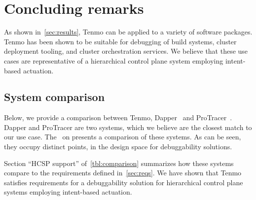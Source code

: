 \newpage
\chapter{Concluding remarks}\label{sec:conclusion}

As shown in~\cref{sec:results}, Tenmo can be applied to a variety of software packages. Tenmo has been shown to be suitable for debugging of build systems, cluster deployment tooling, and cluster orchestration services. We believe that these use cases are representative of a hierarchical control plane system employing intent-based actuation.

\section{System comparison}\label{sec:system-comparison}

Below, we provide a comparison between Tenmo, Dapper~\cite{dapper2010} and ProTracer~\cite{protracer-ma2016}. Dapper and ProTracer are two systems, which we believe are the closest match to our use case. The~ on  presents a comparison of these systems. As can be seen, they occupy distinct points, in the design space for debuggability solutions.

Section ``HCSP support'' 
%
%
of~\cref{tbl:comparison} summarizes how these systems compare to the requirements defined in~\cref{sec:reqs}.  We have shown that Tenmo satisfies requirements for a debuggability solution for hierarchical control plane systems employing intent-based actuation.

